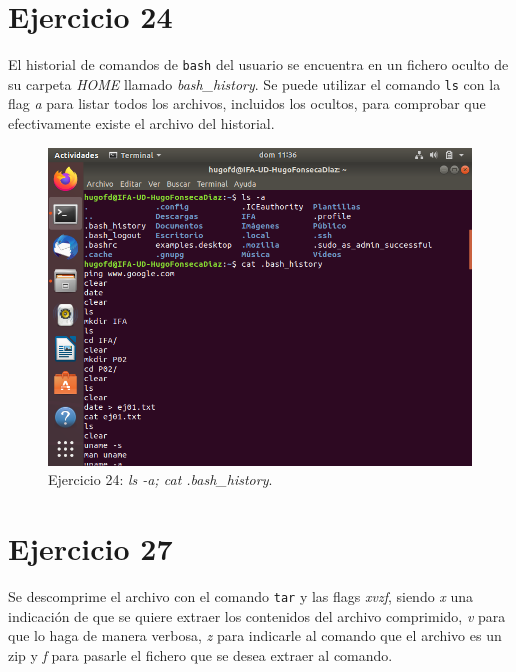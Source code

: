 \documentclass[11pt]{article}
\begin{document}
\section{Ejercicio 24}
El historial de comandos de \verb|bash| del usuario se encuentra en un fichero oculto de su carpeta \textit{HOME} llamado \textit{bash\_history}. Se puede  utilizar el comando \verb|ls| con la flag \textit{a} para listar todos los archivos, incluidos los ocultos, para comprobar que efectivamente existe el archivo del historial.

\begin{figure}[H]
    \caption{Ejercicio 24: \textit{ls -a; cat .bash\_history}.}
  \centering
  \includegraphics[scale=0.7]{e24.png}
\end{figure}

\section{Ejercicio 27}
Se descomprime el archivo con el comando \verb|tar| y las flags \textit{xvzf}, siendo \textit{x} una indicación de que se quiere extraer los contenidos del archivo comprimido, \textit{v} para que lo haga de manera verbosa, \textit{z} para indicarle al comando que el archivo es un zip y \textit{f} para pasarle el fichero que se desea extraer al comando.
\end{document}
